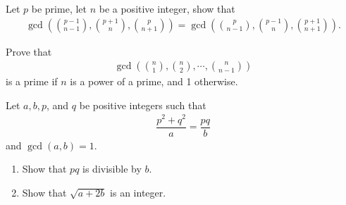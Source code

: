 \documentclass{subfile}
\begin{document}
	\begin{problem}
		Let $p$ be prime, let $n$ be a positive integer, show that
			\begin{align*}
				\gcd\left(\binom{p-1}{n-1}, \binom{p+1}{n}, \binom{p}{n+1}\right) = \gcd\left(\binom{p}{n-1}, \binom{p-1}{n}, \binom{p+1}{n+1}\right).
			\end{align*}
	\end{problem}




	\begin{problem}
		Prove that
			\begin{align*}
				\gcd{\left(\binom{n}{1},\binom{n}{2},\cdots,\binom{n}{n-1}\right)}
			\end{align*}
		is a prime if $n$ is a power of a prime, and 1 otherwise. %
	\end{problem}

%

	\begin{problem}
		Let $a,b,p$, and $q$ be positive integers such that
			\begin{align*}
				\dfrac {p^{2} + q^{2}}{a} = \dfrac {pq}{b}
			\end{align*}
		and $\gcd(a, b) = 1.$
		\begin{enumerate}
			\item  Show that $pq$ is divisible by $b$.

			\item Show that $\sqrt {a + 2b}$ is an integer.
		\end{enumerate} %
	\end{problem}
\end{document}

